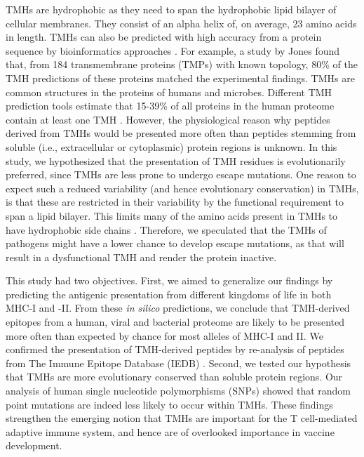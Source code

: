 \documentclass[utf8]{frontiersSCNS} %
\begin{document}
TMHs are hydrophobic 
as they need to span the hydrophobic lipid bilayer of cellular membranes.
They consist of an alpha helix of, on average, 23 amino acids in length. 
TMHs can also be predicted with high accuracy from a protein sequence 
by bioinformatics approaches \citep{krogh2001predicting,kall2004combined,arai2004conpred,jones2007improving,klammer2009metatm,wang2019efficient}. 
For example, a study by Jones \citep{jones2007improving} found that,
from 184 transmembrane proteins (TMPs) with known topology, 
80\% of the TMH predictions of these proteins
matched the experimental findings.
TMHs are common structures in the proteins of humans and microbes. 
Different TMH prediction tools estimate that 15-39\% of all proteins 
in the human proteome contain at least one TMH \citep{ahram2006estimation}.
However, the physiological reason why peptides derived from TMHs 
would be presented more often than peptides 
stemming from soluble (i.e., extracellular or cytoplasmic) protein regions is unknown. 
In this study, we hypothesized that the presentation of 
TMH residues is evolutionarily preferred, 
since TMHs are less prone to undergo escape mutations. 
One reason to expect such a reduced 
variability (and hence evolutionary conservation) in TMHs, 
is that these are restricted in their variability 
by the functional requirement to span a lipid bilayer. 
This limits 
many of the amino acids present in TMHs 
to have hydrophobic side chains 
\citep{hessa2007molecular,jones1994model}.
Therefore, we speculated that the TMHs of pathogens 
might have a lower chance to develop escape mutations, 
as that will result in a dysfunctional TMH 
and render the protein inactive.

This study had two objectives. 
First, we aimed to generalize our findings by predicting
the antigenic presentation
from different kingdoms of life in both MHC-I and -II. 
From these \emph{in silico} predictions, we conclude that TMH-derived
epitopes from a human, viral and bacterial proteome
are likely to be presented more often than expected by chance 
for most alleles of MHC-I and II. 
We confirmed the presentation of TMH-derived peptides 
by re-analysis of peptides from The Immune Epitope Database (IEDB) \citep{vita2019immune}.
Second, we tested our hypothesis that TMHs 
are more evolutionary conserved than soluble protein regions.
Our analysis of human single nucleotide polymorphisms (SNPs) showed 
that random point mutations are indeed less likely
to occur within TMHs. 
These findings strengthen the emerging notion 
that TMHs are important for the T cell-mediated adaptive immune system, 
and hence are of  
overlooked importance in vaccine development.
\end{document}
